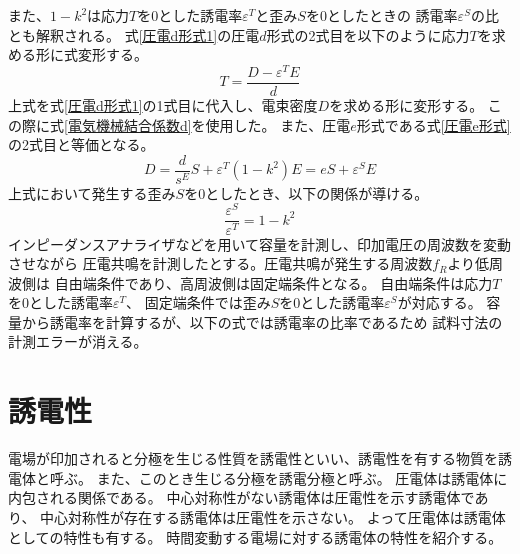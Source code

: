 \documentclass[dvipdfmx,12pt,a4paper]{jreport}
\begin{document}
			また、$1-k^2$は応力$T$を0とした誘電率$\varepsilon^T$と歪み$S$を0としたときの
			誘電率$\varepsilon^S$の比とも解釈される。
			式\eqref{圧電d形式1}の圧電$d$形式の2式目を以下のように応力$T$を求める形に式変形する。			
			\begin{equation}
				T = \frac{D-\varepsilon^T E}{d}
			\end{equation}
			上式を式\eqref{圧電d形式1}の1式目に代入し、電束密度$D$を求める形に変形する。
			この際に式\eqref{電気機械結合係数d}を使用した。
			また、圧電$e$形式である式\eqref{圧電e形式}の2式目と等価となる。
			\begin{equation}
				D = \frac{d}{s^E}S + \varepsilon^T\left(1-k^2\right)E
				  = e S + \varepsilon^S E
			\end{equation}
			上式において発生する歪み$S$を0としたとき、以下の関係が導ける。
			\begin{equation}
				\frac{\varepsilon^S}{\varepsilon^T}=1-k^2
			\end{equation}
			インピーダンスアナライザなどを用いて容量を計測し、印加電圧の周波数を変動させながら
			圧電共鳴を計測したとする。圧電共鳴が発生する周波数$f_R$より低周波側は
			自由端条件であり、高周波側は固定端条件となる。
			自由端条件は応力$T$を0とした誘電率$\varepsilon^T$、
			固定端条件では歪み$S$を0とした誘電率$\varepsilon^S$が対応する。
			容量から誘電率を計算するが、以下の式では誘電率の比率であるため
			試料寸法の計測エラーが消える。

			\newpage
		\section{誘電性}
		電場が印加されると分極を生じる性質を誘電性といい、誘電性を有する物質を誘電体と呼ぶ。
		また、このとき生じる分極を誘電分極と呼ぶ。
		圧電体は誘電体に内包される関係である。
		中心対称性がない誘電体は圧電性を示す誘電体であり、
		中心対称性が存在する誘電体は圧電性を示さない。
		よって圧電体は誘電体としての特性も有する。
		時間変動する電場に対する誘電体の特性を紹介する。
\end{document}
